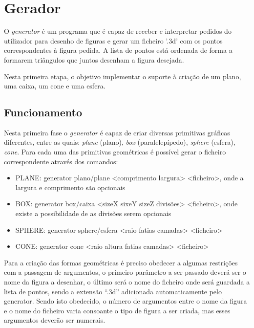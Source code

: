 \chapter{Gerador}
\label{cap:p1}


O \textit{generator} é um programa que é capaz de receber e interpretar pedidos do utilizador para desenho de figuras e gerar um ficheiro '.3d' com os pontos correspondentes à figura pedida. A lista de pontos está ordenada de forma a formarem triângulos que juntos desenham a figura desejada. 

Nesta primeira etapa, o objetivo implementar o suporte à criação de um plano, uma caixa, um cone e uma esfera. 


\section{Funcionamento}

Nesta primeira fase o \textit{generator} é capaz de criar diversas primitivas gráficas
diferentes, entre as quais: \textit{plane} (plano), \textit{box} (paralelepípedo), \textit{sphere} (esfera), \textit{cone}. Para cada uma das primitivas geométricas é possível gerar o ficheiro correspondente através dos comandos:

\begin{itemize}
	\item PLANE: generator plano/plane <comprimento largura> <ficheiro>, onde a largura e comprimento são opcionais 
	
	\item BOX: generator box/caixa <sizeX sixeY sizeZ divisões> <ficheiro>, onde existe a possibilidade de as divisões serem opcionais
	
	\item SPHERE: generator sphere/esfera <raio fatias camadas> <ficheiro>
	
	\item CONE: generator cone <raio altura fatias camadas> <ficheiro>
	
\end{itemize}


Para a criação das formas geométricas é preciso obedecer a algumas restrições
com a passagem de argumentos, o primeiro parâmetro a ser passado deverá
ser o nome da figura a desenhar, o último será o nome do ficheiro onde será
guardada a lista de pontos, sendo a extensão “.3d” adicionada automaticamente
pelo generator. Sendo isto obedecido, o número de argumentos entre
o nome da figura e o nome do ficheiro varia consoante o tipo de figura a ser
criada, mas esses argumentos deverão ser numerais.

